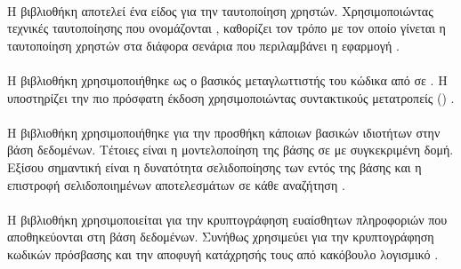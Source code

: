 \paragraph{}
\paragraph{}
Η βιβλιοθήκη  αποτελεί ένα είδος  για την ταυτοποίηση χρηστών. Χρησιμοποιώντας τεχνικές ταυτοποίησης που ονομάζονται , καθορίζει τον τρόπο με τον οποίο γίνεται η ταυτοποίηση χρηστών στα διάφορα σενάρια που περιλαμβάνει η εφαρμογή \cite{[PASSPORT]}. 


\paragraph{}
\paragraph{}
Η βιβλιοθήκη  χρησιμοποιήθηκε ως ο βασικός μεταγλωττιστής του κώδικα από  σε . Η  υποστηρίζει την πιο πρόσφατη έκδοση  χρησιμοποιώντας συντακτικούς μετατροπείς () \cite{[BABEL]}.


\paragraph{}
\paragraph{}
Η βιβλιοθήκη  χρησιμοποιήθηκε για την προσθήκη κάποιων βασικών ιδιοτήτων στην βάση δεδομένων. Τέτοιες είναι η μοντελοποίηση της βάσης σε  με συγκεκριμένη δομή. Εξίσου σημαντική είναι η δυνατότητα σελιδοποίησης των  εντός της βάσης και η επιστροφή σελιδοποιημένων αποτελεσμάτων σε κάθε αναζήτηση \cite{[MONGOOSE]}. 


\paragraph{}
\paragraph{}
Η βιβλιοθήκη  χρησιμοποιείται για την κρυπτογράφηση ευαίσθητων πληροφοριών που αποθηκεύονται στη βάση δεδομένων. Συνήθως χρησιμεύει για την κρυπτογράφηση κωδικών πρόσβασης και την αποφυγή κατάχρησής τους από κακόβουλο λογισμικό \cite{[BCRYPT]}.





